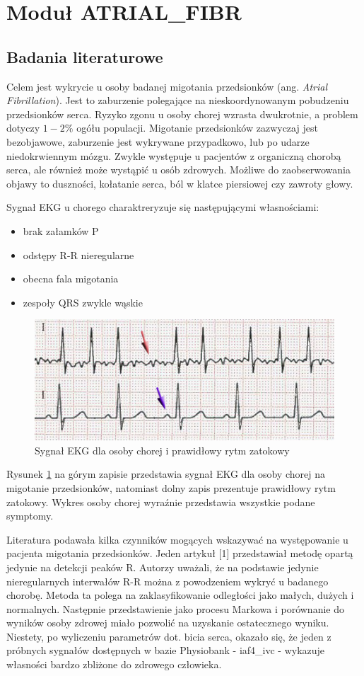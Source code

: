 \section{Moduł ATRIAL\_FIBR}
\subsection{Badania literaturowe}
Celem jest wykrycie u osoby badanej migotania przedsionków (ang. \textit{Atrial Fibrillation}). 
Jest to zaburzenie polegające na nieskoordynowanym pobudzeniu przedsionków serca. 
Ryzyko zgonu u osoby chorej wzrasta dwukrotnie, a problem dotyczy $1-2\%$ ogółu populacji.
Migotanie przedsionków zazwyczaj jest bezobjawowe, zaburzenie jest wykrywane przypadkowo,
lub po udarze niedokrwiennym mózgu.
Zwykle występuje u pacjentów z organiczną chorobą serca, ale również może wystąpić u osób zdrowych.
Możliwe do zaobserwowania objawy to duszności, kołatanie serca, ból w klatce piersiowej czy zawroty głowy.

Sygnał EKG u chorego charaktreryzuje się następującymi własnościami:
\begin{itemize}
  \item brak załamków P
  \item odstępy R-R nieregularne
  \item obecna fala migotania
  \item zespoły QRS zwykle wąskie
\end{itemize}
\begin{figure}[ht]
\centering
\includegraphics{ATRIAL_FIBR/img/AF_ecg.jpg}
\caption{Sygnał EKG dla osoby chorej i prawidłowy rytm zatokowy} \label{fig:AF_ecg}
\end{figure}

Rysunek \ref{fig:AF_ecg} na górym zapisie przedstawia sygnał EKG dla osoby chorej na migotanie przedsionków,
natomiast dolny zapis prezentuje prawidłowy rytm zatokowy.
Wykres osoby chorej wyraźnie przedstawia wszystkie podane symptomy.

Literatura podawała kilka czynników mogących wskazywać na występowanie u pacjenta migotania przedsionków. 
Jeden artykuł [1] przedstawiał metodę opartą jedynie na detekcji peaków R. 
Autorzy uważali, że na podstawie jedynie nieregularnych interwałów R-R 
można z powodzeniem wykryć u badanego chorobę. 
Metoda ta polega na zaklasyfikowanie odległości jako małych, dużych i normalnych. 
Następnie przedstawienie jako procesu Markowa i porównanie do wyników osoby zdrowej miało pozwolić 
na uzyskanie ostatecznego wyniku.
Niestety, po wyliczeniu parametrów dot. bicia serca, 
okazało się, że jeden z próbnych sygnałów dostępnych w bazie Physiobank - 
iaf4\_ivc - wykazuje własności bardzo zbliżone do zdrowego człowieka.

